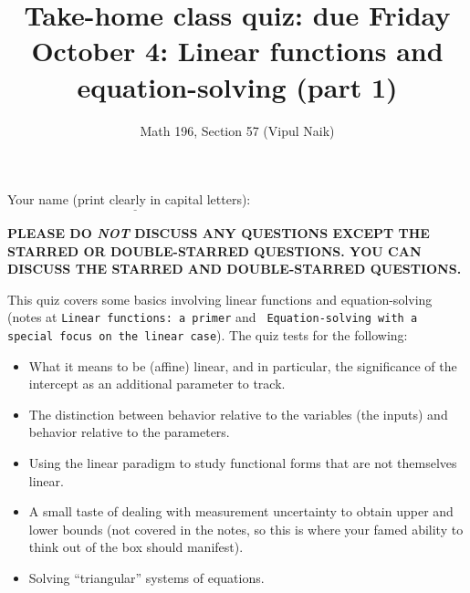 \documentclass[10pt]{amsart}
\title{Take-home class quiz: due Friday October 4: Linear functions and equation-solving (part 1)}
\author{Math 196, Section 57 (Vipul Naik)}
\begin{document}
\maketitle

Your name (print clearly in capital letters): $\underline{\qquad\qquad\qquad\qquad\qquad\qquad\qquad\qquad\qquad\qquad}$

{\bf PLEASE DO {\em NOT} DISCUSS ANY QUESTIONS EXCEPT THE STARRED OR DOUBLE-STARRED QUESTIONS. YOU CAN DISCUSS THE STARRED AND DOUBLE-STARRED QUESTIONS.}

This quiz covers some basics involving linear functions and
equation-solving (notes at {\tt Linear functions: a primer} and {\tt
  Equation-solving with a special focus on the linear case}). The quiz
tests for the following:

\begin{itemize}
\item What it means to be (affine) linear, and in particular, the
  significance of the intercept as an additional parameter to track.
\item The distinction between behavior relative to the variables (the
  inputs) and behavior relative to the parameters.
\item Using the linear paradigm to study functional forms that are not
  themselves linear.
\item A small taste of dealing with measurement uncertainty to obtain
  upper and lower bounds (not covered in the notes, so this is where
  your famed ability to think out of the box should manifest).
\item Solving ``triangular'' systems of equations.
\end{itemize}
\end{document}

